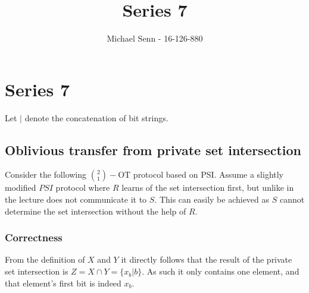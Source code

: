 \documentclass[a4paper]{scrreprt}
\title{Series 7}
\author{Michael Senn \maillink{michael.senn@students.unibe.ch} - 16-126-880}
\date{\printdate}
\begin{document}
\maketitle


\setcounter{chapter}{6}

\chapter{Series 7}

Let $|$ denote the concatenation of bit strings.

\section{Oblivious transfer from private set intersection}

Consider the following $\binom{2}{1}-\text{OT}$ protocol based on PSI.  Assume
a slightly modified $PSI$ protocol where $R$ learns of the set intersection
first, but unlike in the lecture does not communicate it to $S$. This can
easily be achieved as $S$ cannot determine the set intersection without the
help of $R$.


\subsection{Correctness}

From the definition of $X$ and $Y$ it directly follows that the result of the
private set intersection is $Z = X \cap Y = \{x_b | b\}$. As such it only
contains one element, and that element's first bit is indeed $x_b$.
\end{document}
